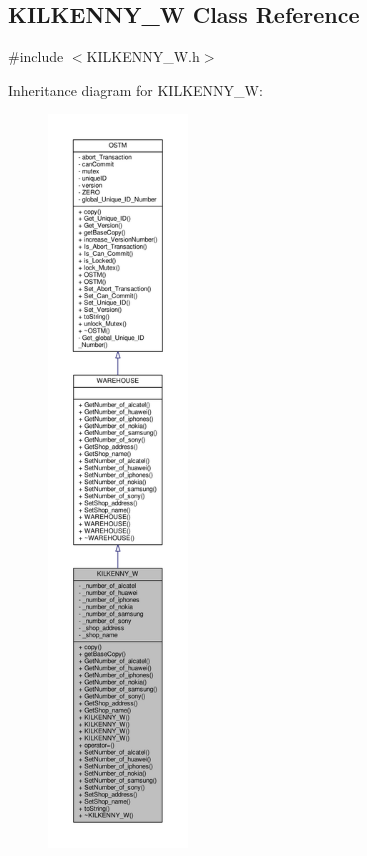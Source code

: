 \hypertarget{class_k_i_l_k_e_n_n_y___w}{}\subsection{K\+I\+L\+K\+E\+N\+N\+Y\+\_\+W Class Reference}
\label{class_k_i_l_k_e_n_n_y___w}


{\ttfamily \#include $<$K\+I\+L\+K\+E\+N\+N\+Y\+\_\+\+W.\+h$>$}



Inheritance diagram for K\+I\+L\+K\+E\+N\+N\+Y\+\_\+W\+:\nopagebreak
\begin{figure}[H]
\begin{center}
\leavevmode
\includegraphics[height=550pt]{class_k_i_l_k_e_n_n_y___w__inherit__graph}
\end{center}
\end{figure}


